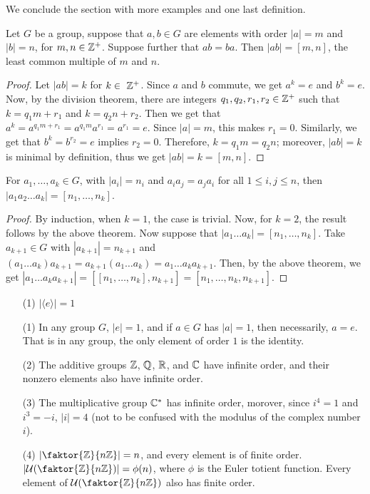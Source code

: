 We conclude the section with more examples and one last definition.

\begin{lemma}\label{lemma_1.2.5}
  Let $G$ be a group, suppose that  $a,b \in G$ are elements with
  order $|a|=m$ and  $|b|=n$, for  $m,n \in \mathbb{Z}^+$. Suppose further
  that $ab=ba$. Then $|ab|=[m,n]$, the least common multiple of $m$
  and  $n$.
\end{lemma}
\begin{proof}
  Let $|ab|=k$ for $k \in \ \mathbb{Z}^+$. Since  $a$ and  $b$ commute, we get
  $a^k=e$ and  $b^k=e$. Now, by the division theorem, there are integers
  $q_1,q_2,r_1,r_2 \in \mathbb{Z}^+$ such that $k=q_1m+r_1$ and $k=q_2n+r_2$. Then we
  get that $a^k=a^{q_1m+r_1}=a^{q_1m}a^{r_1}=a^{r_1}=e$. Since $|a|=m$,
  this makes $r_1=0$. Similarly, we get that $b^k=b^{r_2}=e$ implies $r_2=0$.
  Therefore, $k=q_1m=q_2n$; moreover, $|ab|=k$ is minimal by definition,
  thus we get $|ab|=k=[m,n]$.
\end{proof}
\begin{corollary}
  For $a_1, \dots, a_k \in G$, with $|a_i|=n_i$ and $a_ia_j=a_ja_i$ for
  all  $1 \leq i,j \leq n$, then  $|a_1a_2 \dots a_k|=[n_1, \dots, n_k]$.
\end{corollary}
\begin{proof}
  By induction, when $k=1$, the case is trivial. Now, for  $k=2$, the result
  follows by the above theorem. Now suppose that $|a_1 \dots a_k|=[n_1,
  \dots, n_k]$. Take $a_{k+1} \in G$ with $|a_{k+1}|=n_{k+1}$ and $(a_1
  \dots a_k)a_{k+1}=a_{k+1}(a_1 \dots a_k)=a_1 \dots a_ka_{k+1}$. Then, by the
  above theorem, we get $|a_1 \dots a_ka_{k+1}|=[[n_1, \dots, n_k],
  n_{k+1}]=[n_1, \dots, n_k, n_{k+1}]$.
\end{proof}

\begin{example}
  \begin{enumerate}
    \item[(1)] $|\langle e \rangle|=1$
    \item[(1)] In any group $G$,  $|e|=1$, and if $a \in G$ has
      $|a|=1$, then necessarily, $a=e$. That is in any group, the only
      element of order  $1$ is the identity.

    \item[(2)] The additive groups $\mathbb{Z}$,  $\mathbb{Q}$,  $\mathbb{R}$, and  $\mathbb{C}$ have
      infinite order, and their nonzero elements also have infinite order.

    \item[(3)] The multiplicative group $\mathbb{C}^*$ has infinite order, morover,
      since $i^4=1$ and $i^3=-i$, $|i|=4$ (not to be confused with the
      modulus of the complex number $i$).

    \item[(4)] $|\faktor{\Z}{n\Z}|=n$, and every element is of finite
      order. $|\Uc{(\faktor{\Z}{n\Z})}|=\phi(n)$, where $\phi$ is the Euler
      totient function. Every element of $\Uc{(\faktor{\Z}{n\Z})}$ also has
      finite order.
  \end{enumerate}
\end{example}

